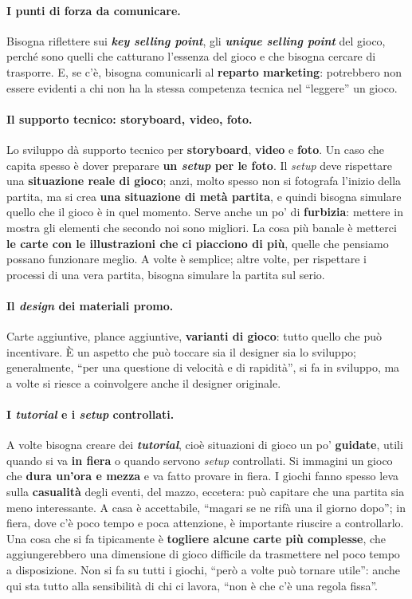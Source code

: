 \paragraph{I punti di forza da comunicare.} Bisogna riflettere sui \textbf{\emph{key selling
point}}, gli \textbf{\emph{unique selling point}} del gioco, perché sono quelli che catturano
l'essenza del gioco e che bisogna cercare di trasporre. E, se c'è, bisogna comunicarli al
\textbf{reparto marketing}: potrebbero non essere evidenti a chi non ha la stessa competenza
tecnica nel ``leggere'' un gioco.

\paragraph{Il supporto tecnico: storyboard, video, foto.} Lo sviluppo dà supporto tecnico per
\textbf{storyboard}, \textbf{video} e \textbf{foto}. Un caso che capita spesso è dover
preparare \textbf{un \emph{setup} per le foto}. Il \emph{setup} deve rispettare una
\textbf{situazione reale di gioco}; anzi, molto spesso non si fotografa l'inizio della
partita, ma si crea \textbf{una situazione di metà partita}, e quindi bisogna simulare
quello che il gioco è in quel momento. Serve anche un po' di \textbf{furbizia}: mettere in
mostra gli elementi che secondo noi sono migliori. La cosa più banale è metterci \textbf{le
carte con le illustrazioni che ci piacciono di più}, quelle che pensiamo possano funzionare
meglio. A volte è semplice; altre volte, per rispettare i processi di una vera partita,
bisogna simulare la partita sul serio.

\paragraph{Il \emph{design} dei materiali promo.} Carte aggiuntive, plance aggiuntive,
\textbf{varianti di gioco}: tutto quello che può incentivare. È un aspetto che può toccare
sia il designer sia lo sviluppo; generalmente, ``per una questione di velocità e di
rapidità'', si fa in sviluppo, ma a volte si riesce a coinvolgere anche il designer
originale.

\paragraph{I \emph{tutorial} e i \emph{setup} controllati.} A volte bisogna creare dei
\textbf{\emph{tutorial}}, cioè situazioni di gioco un po' \textbf{guidate}, utili quando si va
\textbf{in fiera} o quando servono \emph{setup} controllati. Si immagini un gioco che
\textbf{dura un'ora e mezza} e va fatto provare in fiera. I giochi fanno spesso leva sulla
\textbf{casualità} degli eventi, del mazzo, eccetera: può capitare che una partita sia meno
interessante. A casa è accettabile, ``magari se ne rifà una il giorno dopo''; in fiera, dove
c'è poco tempo e poca attenzione, è importante riuscire a controllarlo. Una cosa che si fa
tipicamente è \textbf{togliere alcune carte più complesse}, che aggiungerebbero una
dimensione di gioco difficile da trasmettere nel poco tempo a disposizione. Non si fa su
tutti i giochi, ``però a volte può tornare utile'': anche qui sta tutto alla sensibilità di
chi ci lavora, ``non è che c'è una regola fissa''.

